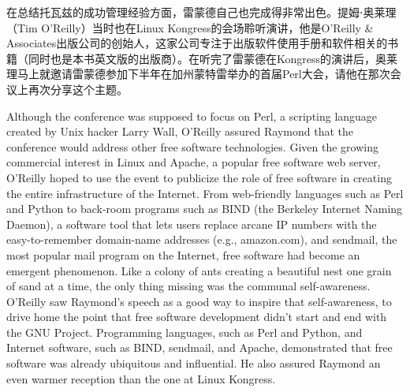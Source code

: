 \ifdefined\chs
在总结托瓦兹的成功管理经验方面，雷蒙德自己也完成得非常出色。提姆⋅奥莱理（Tim O'Reilly）当时也在Linux Kongress的会场聆听演讲，他是O'Reilly \& Associates出版公司的创始人，这家公司专注于出版软件使用手册和软件相关的书籍（同时也是本书英文版的出版商）。在听完了雷蒙德在Kongress的演讲后，奥莱理马上就邀请雷蒙德参加下半年在加州蒙特雷举办的首届Perl大会，请他在那次会议上再次分享这个主题。
\fi

\ifdefined\eng
Although the conference was supposed to focus on Perl, a scripting language created by Unix hacker Larry Wall, O'Reilly assured Raymond that the conference would address other free software technologies. Given the growing commercial interest in Linux and Apache, a popular free software web server, O'Reilly hoped to use the event to publicize the role of free software in creating the entire infrastructure of the Internet. From web-friendly languages such as Perl and Python to back-room programs such as BIND (the Berkeley Internet Naming Daemon), a software tool that lets users replace arcane IP numbers with the easy-to-remember domain-name addresses (e.g., amazon.com), and sendmail, the most popular mail program on the Internet, free software had become an emergent phenomenon. Like a colony of ants creating a beautiful nest one grain of sand at a time, the only thing missing was the communal self-awareness. O'Reilly saw Raymond's speech as a good way to inspire that self-awareness, to drive home the point that free software development didn't start and end with the GNU Project. Programming languages, such as Perl and Python, and Internet software, such as BIND, sendmail, and Apache, demonstrated that free software was already ubiquitous and influential. He also assured Raymond an even warmer reception than the one at Linux Kongress.
\fi

